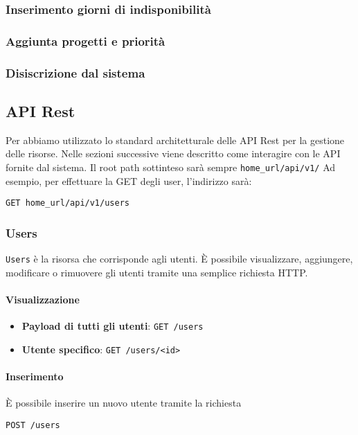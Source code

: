 \subsubsection{Inserimento giorni di indisponibilità}

\subsubsection{Aggiunta progetti e priorità}

\subsubsection{Disiscrizione dal sistema}

\subsection{API Rest}\label{APIRest}

\newcommand{\homeUrl}{home\_url}

Per \progetto abbiamo utilizzato lo standard architetturale delle API Rest per la gestione delle risorse.
Nelle sezioni successive viene descritto come interagire con le API fornite dal sistema.
Il root path sottinteso sarà sempre \texttt{\homeUrl/api/v1/}
Ad esempio, per effettuare la GET degli user, l'indirizzo sarà:
\begin{center}
    \texttt{GET \homeUrl/api/v1/users}
\end{center}

\subsubsection{Users}

\texttt{Users} è la risorsa che corrisponde agli utenti.
È possibile visualizzare, aggiungere, modificare o rimuovere gli utenti tramite una semplice
richiesta HTTP.

\paragraph{Visualizzazione}

\begin{itemize}
    \item \textbf{Payload di tutti gli utenti}: \texttt{GET /users}
    \item \textbf{Utente specifico}: \texttt{GET /users/<id>}
\end{itemize}

\paragraph{Inserimento}
È possibile inserire un nuovo utente tramite la richiesta
    \begin{center}
        \texttt{POST /users}
    \end{center}

